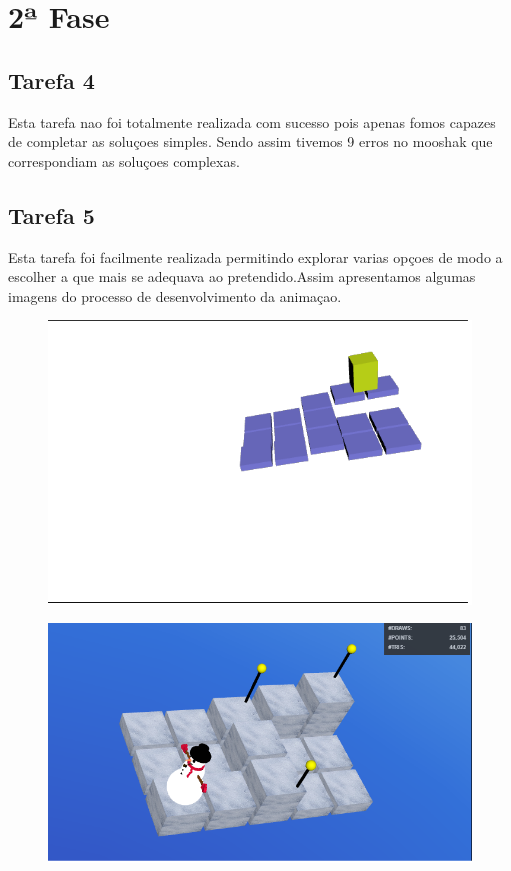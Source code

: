 \documentclass{report}
\begin{document}
\section{2ª Fase}
\subsection{Tarefa 4}
Esta tarefa nao foi totalmente realizada com sucesso pois apenas fomos capazes de completar as soluçoes simples. Sendo assim tivemos 9 erros no mooshak que correspondiam as soluçoes complexas.
\subsection{Tarefa 5}
Esta tarefa foi facilmente realizada permitindo explorar varias opçoes de modo a escolher a que mais se adequava ao pretendido.Assim apresentamos algumas imagens do processo de desenvolvimento da animaçao.
\begin{figure}
\centering
\includegraphics[scale=0.5]{ht1.png}
\end{figure}

\begin{figure}
\centering
\includegraphics[scale=0.5]{ht2.png}
\end{figure}
\end{document}
